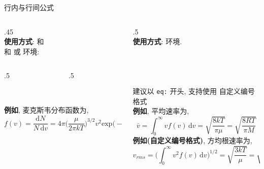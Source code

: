 \begin{frame}{行内与行间公式}
\begin{columns}[T, onlytextwidth]
\begin{column}{.45\columnwidth}
			\\[1ex]
			\textbf{使用方式}:  和 \\[.5ex]
			和  或  环境:\\[.5ex]
			\begin{columns}[onlytextwidth]
				\begin{column}{.5\textwidth}
					\\
					\hspace*{1em}\\
				\end{column}
				\begin{column}{.5\textwidth}
					\\
					\hspace*{1em}\\
				\end{column}
			\end{columns}\vspace*{1ex}
			\textbf{例如}, 麦克斯韦分布函数为,\\[-3ex]
			\begin{equation*}
				f(v) = \dfrac{\mathrm{d}N}{N\,\mathrm{d}v} = 4\pi \Big(\dfrac{\mu}{2\pi kT}\Big)^{3/2} v^2 \mathrm{exp}\Big(-\dfrac{\mu v^2}{2kT}\Big)
			\end{equation*}
		\end{column}
		\begin{column}{.5\columnwidth}
			\\[1ex]
			\textbf{使用方式}:  环境.\\[.5ex]
			\\
			\hspace*{1em}\\
			\hspace*{1em}\\
			\\[.5ex]
			 建议以 \texttt{eq:} 开头,  支持使用  自定义编号格式 \\[1ex]
			\textbf{例如}, 平均速率为,\\[-1ex]
			\begin{equation}
				\bar{v} = \int_0^\infty vf(v)\,\mathrm{d}v = \sqrt{\dfrac{8kT}{\pi\mu}} = \sqrt{\dfrac{8RT}{\pi M}}
			\end{equation}
			\textbf{例如(自定义编号格式)}, 方均根速率为,\\[-3ex]
			\begin{equation}
				v_{rms} = \Big(\int_0^\infty v^2f(v)\,\mathrm{d}v\Big)^{1/2} = \sqrt{\dfrac{3kT}{\mu}} = \sqrt{\dfrac{3RT}{M}}
				\tag{$\alpha$}
			\end{equation}
		\end{column}
	\end{columns}
\end{frame}

